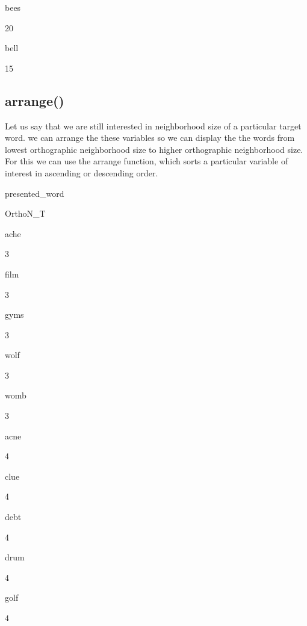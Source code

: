 \documentclass[]{book}
\newenvironment{Shaded}{\begin{snugshade}}{\end{snugshade}}
\newcommand{\KeywordTok}[1]{\textcolor[rgb]{0.13,0.29,0.53}{\textbf{#1}}}
\newcommand{\DataTypeTok}[1]{\textcolor[rgb]{0.13,0.29,0.53}{#1}}
\newcommand{\StringTok}[1]{\textcolor[rgb]{0.31,0.60,0.02}{#1}}
\newcommand{\OperatorTok}[1]{\textcolor[rgb]{0.81,0.36,0.00}{\textbf{#1}}}
\newcommand{\NormalTok}[1]{#1}
\begin{document}
bees

20

bell

15

\subsection{arrange()}\label{arrange}

Let us say that we are still interested in neighborhood size of a
particular target word. we can arrange the these variables so we can
display the the words from lowest orthographic neighborhood size to
higher orthographic neighborhood size. For this we can use the arrange
function, which sorts a particular variable of interest in ascending or
descending order.

\begin{Shaded}
\end{Shaded}

presented\_word

OrthoN\_T

ache

3

film

3

gyms

3

wolf

3

womb

3

acne

4

clue

4

debt

4

drum

4

golf

4
\end{document}
